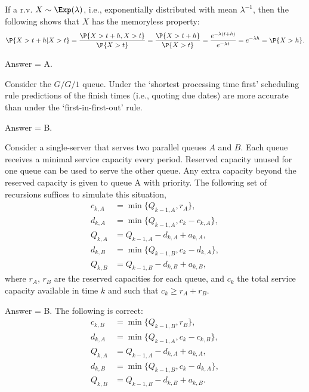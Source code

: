 \begin{exercise}[201802]
If a r.v. $X\sim\Exp(\lambda)$, i.e., exponentially distributed with mean $\lambda^{-1}$, then the following shows that $X$ has the memoryless property:
\begin{equation*}
 \P{X>t+h|X>t} = \frac{\P{X>t+h, X>t}}{\P{X>t}} = \frac{\P{X>t+h}}{\P{X>t}} = \frac{e^{-\lambda(t+h)}}{e^{-\lambda t}} = e^{-\lambda h} = \P{X>h}.
\end{equation*}

\begin{solution}
Answer = A.
\end{solution}
\end{exercise}

\begin{exercise}[201803]
Consider the $G/G/1$ queue. Under the `shortest processing time first' scheduling rule predictions of the finish times (i.e., quoting due dates) are more accurate than under the `first-in-first-out' rule.
\begin{solution}
Answer = B.
\end{solution}
\end{exercise}

\begin{exercise}[201803]
 Consider a single-server that serves two parallel queues $A$ and $B$. Each queue receives a minimal service capacity every period. Reserved capacity unused for one queue can be
 used to serve the other queue. Any extra capacity beyond the
 reserved capacity is given to queue A with priority. The following set
 of recursions suffices to simulate this situation,
\begin{align*}
 c_{k,A} &= \min\{Q_{ k-1, A}, r_A\},\\
d_{k,A} &= \min\{Q_{k-1, A}, c_k-c_{k,A}\},\\
Q_{k,A} &= Q_{k-1, A} - d_{k,A} + a_{k,A},\\
d_{k,B} &= \min\{Q_{k-1, B}, c_k-d_{k,A}\}, \\
Q_{k,B} &= Q_{k-1, B} - d_{k,B} + a_{k,B},
\end{align*}
where $r_A$, $r_B$ are the reserved capacities for each queue, and $c_k$ the total service capacity available in time $k$ and such that $c_k \geq r_A+r_B$.

\begin{solution}
Answer = B. The following is correct: 
\begin{align*}
 c_{k,B} &= \min\{Q_{ k-1, B}, r_B\},\\
d_{k,A} &= \min\{Q_{k-1, A}, c_k-c_{k,B}\},\\
Q_{k,A} &= Q_{k-1, A} - d_{k,A} + a_{k,A},\\
d_{k,B} &= \min\{Q_{k-1, B}, c_k-d_{k,A}\},\\
Q_{k,B} &= Q_{k-1, B} - d_{k,B} + a_{k,B}.
\end{align*}
\end{solution}
\end{exercise}

